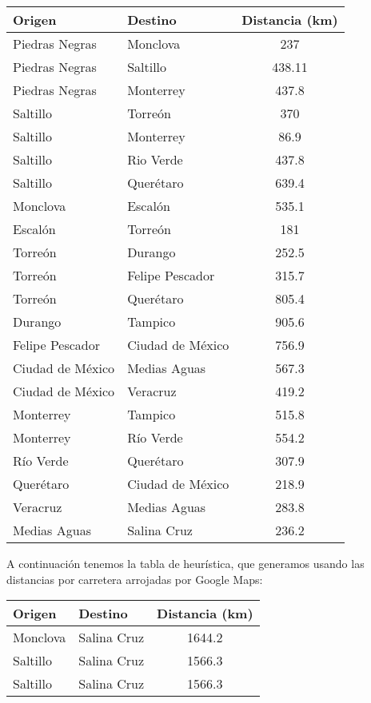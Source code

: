 \documentclass{article}
\begin{document}
\begin{enumerate}[\textbf{4.}]
\begin{itemize}[1.]
    \begin{center}
      \begin{tabular}{l l c}
        \textbf{Origen} & \textbf{Destino} & \textbf{Distancia (km)} \\
        \hline 
        Piedras Negras & Monclova & 237 \\ %
        Piedras Negras & Saltillo & 438.11 \\
        Piedras Negras & Monterrey & 437.8 \\
        \hline
        Saltillo & Torreón & 370 \\
        Saltillo & Monterrey & 86.9 \\
        Saltillo & Rio Verde & 437.8 \\
        Saltillo & Querétaro & 639.4 \\
        \hline
        Monclova & Escalón & 535.1 \\
        \hline
        Escalón & Torreón & 181 \\
        \hline
        Torreón & Durango & 252.5 \\
        Torreón & Felipe Pescador & 315.7 \\
        Torreón & Querétaro & 805.4 \\
        \hline
        Durango & Tampico & 905.6 \\
        \hline
        Felipe Pescador & Ciudad de México & 756.9 \\
        \hline
        Ciudad de México & Medias Aguas & 567.3 \\ 
        Ciudad de México & Veracruz & 419.2 \\
        \hline
        Monterrey & Tampico & 515.8 \\
        Monterrey & Río Verde & 554.2 \\
        \hline
        Río Verde & Querétaro & 307.9 \\
        \hline
        Querétaro & Ciudad de México & 218.9 \\
        \hline
        Veracruz & Medias Aguas & 283.8 \\
        \hline
        Medias Aguas & Salina Cruz & 236.2 \\
      \end{tabular}
    \end{center}
  \end{itemize}

  A continuación tenemos la tabla de heurística, que generamos usando las distancias 
  por carretera arrojadas por Google Maps:
  \begin{center}
    \begin{tabular}{l l c}
      \textbf{Origen} & \textbf{Destino} & \textbf{Distancia (km)} \\
      \hline 
      Monclova & Salina Cruz & 1644.2 \\ %
      Saltillo & Salina Cruz & 1566.3 \\ %
      Saltillo & Salina Cruz & 1566.3 \\ %
    \end{tabular}
  \end{center}
\end{enumerate}
\end{document}
